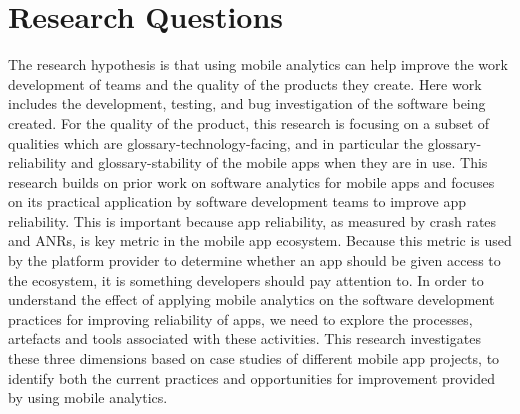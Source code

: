 \section{Research Questions}
\label{section-research-questions}



The research hypothesis is that using mobile analytics can help improve the work development of teams and the quality of the products they create. Here work includes the development, testing, and bug investigation of the software being created. For the quality of the product, this research is focusing on a subset of qualities which are \gls{glossary-technology-facing}, %
and in particular the \gls{glossary-reliability} and \gls{glossary-stability} of the mobile apps when they are in use. This research builds on prior work on software analytics for mobile apps and focuses on its practical application by software development teams to improve app reliability. This is important because app reliability, as measured by crash rates and ANRs, is key metric in the mobile app ecosystem. Because this metric is used by the platform provider to determine whether an app should be given access to the ecosystem, it is something developers should pay attention to. In order to understand the effect of applying mobile analytics on the software development practices for improving reliability of apps, we need to explore the processes, artefacts and tools associated with these activities. This research investigates these three dimensions based on case studies of different mobile app projects, to identify both the current practices and opportunities for improvement provided by using mobile analytics.

